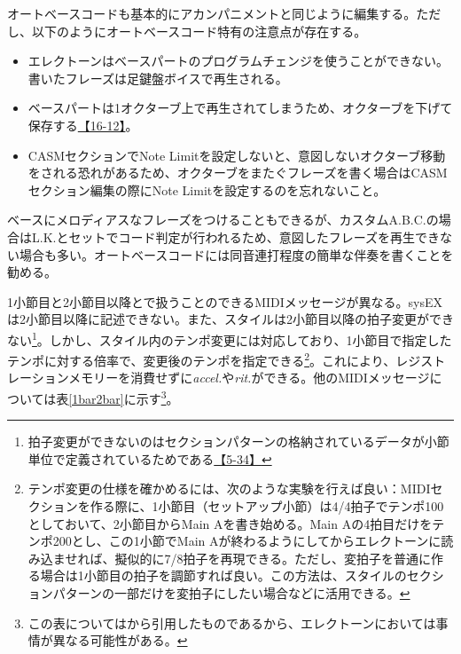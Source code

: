 \documentclass[uplatex, 10pt, dvipdfmx]{jsarticle}
\numberwithin{equation}{section}
\begin{document}
オートベースコードも基本的にアカンパニメントと同じように編集する。ただし、以下のようにオートベースコード特有の注意点が存在する。
\begin{itemize}
\item エレクトーンはベースパートのプログラムチェンジを使うことができない。書いたフレーズは足鍵盤ボイスで再生される。
\item ベースパートは1オクターブ上で再生されてしまうため、オクターブを下げて保存する\href{http://els01stylefile.music.coocan.jp/Stagea_Style/P1612.htm}{【16-12】}。
\item CASMセクションでNote Limitを設定しないと、意図しないオクターブ移動をされる恐れがあるため、オクターブをまたぐフレーズを書く場合はCASMセクション編集の際にNote Limitを設定するのを忘れないこと。
\end{itemize}
ベースにメロディアスなフレーズをつけることもできるが、カスタムA.B.C.の場合はL.K.とセットでコード判定が行われるため、意図したフレーズを再生できない場合も多い。オートベースコードには同音連打程度の簡単な伴奏を書くことを勧める。

1小節目と2小節目以降とで扱うことのできるMIDIメッセージが異なる\cite{style}。sysEXは2小節目以降に記述できない。また、スタイルは2小節目以降の拍子変更ができない\footnote{拍子変更ができないのはセクションパターンの格納されているデータが小節単位で定義されているためである\href{http://els01stylefile.music.coocan.jp/Stagea_Style/Stagea_Style_P34.htm}{【5-34】}}。しかし、スタイル内のテンポ変更には対応しており、1小節目で指定したテンポに対する倍率で、変更後のテンポを指定できる\footnote{テンポ変更の仕様を確かめるには、次のような実験を行えば良い：MIDIセクションを作る際に、1小節目（セットアップ小節）は4/4拍子でテンポ100としておいて、2小節目からMain Aを書き始める。Main Aの4拍目だけをテンポ200とし、この1小節でMain Aが終わるようにしてからエレクトーンに読み込ませれば、擬似的に7/8拍子を再現できる。ただし、変拍子を普通に作る場合は1小節目の拍子を調節すれば良い。この方法は、スタイルのセクションパターンの一部だけを変拍子にしたい場合などに活用できる。}。これにより、レジストレーションメモリーを消費せずに\textit{accel.}や\textit{rit.}ができる。他のMIDIメッセージについては表\ref{1bar2bar}に示す\footnote{この表については\cite{style}から引用したものであるから、エレクトーンにおいては事情が異なる可能性がある。}。
\end{document}
